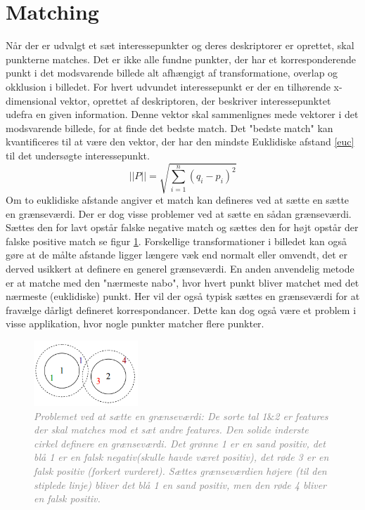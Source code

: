 \section{Matching}
Når der er udvalgt et sæt interessepunkter og deres deskriptorer er oprettet, skal punkterne matches. Det er ikke alle fundne punkter, der har et korresponderende punkt i det modsvarende billede alt afhængigt af transformatione, overlap og okklusion i billedet. For hvert udvundet interessepunkt er der en tilhørende x-dimensional vektor, oprettet af deskriptoren, der beskriver interessepunktet udefra en given information. Denne vektor skal sammenlignes mede vektorer i det modsvarende billede, for at finde det bedste match. Det "bedste match" kan kvantificeres til at være den vektor, der har den mindste Euklidiske afstand \eqref{euc} til det undersøgte interessepunkt. 
\begin{equation}
||P|| = \sqrt{\sum\limits_{i=1}^n(q_i-p_i)^2}
\label{euc}
\end{equation}
Om to euklidiske afstande angiver et match kan defineres ved at sætte en sætte en grænseværdi. Der er dog visse problemer ved at sætte en sådan grænseværdi. Sættes den for lavt opstår falske negative match og sættes den for højt opstår der falske positive match se figur \ref{fig:skift}. Forskellige transformationer i billedet kan også gøre at de målte afstande ligger længere væk end normalt eller omvendt, det er derved usikkert at definere en generel grænseværdi. En anden anvendelig metode er at matche med den "nærmeste nabo", hvor hvert punkt bliver matchet med det nærmeste (euklidiske) punkt. Her vil der også typisk sættes en grænseværdi for at fravælge dårligt defineret korrespondancer. Dette kan dog også være et problem i visse applikation, hvor nogle punkter matcher flere punkter.
\begin{figure}[H]
    \centering
    \includegraphics[width=0.35\textwidth]{fig/22.png}
    \vspace{-0.5em}   
    \begin{center}
    \caption{\textcolor{gray}{\footnotesize \textit{Problemet ved at sætte en grænseværdi: De sorte tal 1$\&$2 er features der skal matches mod et sæt andre features. Den solide inderste cirkel definere  en grænseværdi. Det grønne {\color{OliveGreen}1} er en sand positiv, det blå {\color{blue}1} er en falsk negativ(skulle havde været positiv), det røde {\color{red}3} er en falsk positiv (forkert vurderet). Sættes grænseværdien højere (til den stiplede linje) bliver det blå {\color{blue}1} en sand positiv, men den røde {\color{BrickRed} 4} bliver en falsk positiv. \cite{book1}}}}
    \label{fig:skift}
     \end{center}
  \end{figure}
